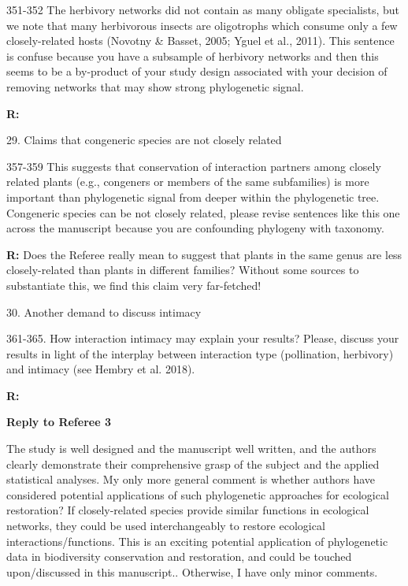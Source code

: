 \documentclass[12pt]{letter}
\newenvironment{refquote}{\bigskip \begin{it}}{\end{it}\smallskip}
\begin{document}
		\begin{refquote}
			351-352 The herbivory networks did not contain as many obligate specialists, but we note that many herbivorous insects are oligotrophs which consume only a few closely-related hosts (Novotny & Basset, 2005; Yguel et al., 2011). This sentence is confuse because you have a subsample of herbivory networks and then this seems to be a by-product of your study design associated with your decision of removing networks that may show strong phylogenetic signal.
		\end{refquote}

		\textbf{R:} 


	29. Claims that congeneric species are not closely related

		\begin{refquote}
			357-359 This suggests that conservation of interaction partners among closely related plants (e.g., congeners or members of the same subfamilies) is more important than phylogenetic signal from deeper within the phylogenetic tree. Congeneric species can be not closely related, please revise sentences like this one across the manuscript because you are confounding phylogeny with taxonomy.
		\end{refquote}


		\textbf{R:} Does the Referee really mean to suggest that plants in the same genus are less closely-related than plants in different families? Without some sources to substantiate this, we find this claim very far-fetched!


	30. Another demand to discuss intimacy

		\begin{refquote}
			361-365. How interaction intimacy may explain your results? Please, discuss your results in light of the interplay between interaction type (pollination, herbivory) and intimacy (see Hembry et al. 2018).
		\end{refquote}


		\textbf{R:}


\clearpage

{\Large \bf Reply to Referee 3}

	\begin{refquote}
		The study is well designed and the manuscript well written, and the authors clearly demonstrate their comprehensive grasp of the subject and the applied statistical analyses.
		My only more general comment is whether authors have considered potential applications of such phylogenetic approaches for ecological restoration? If closely-related species provide similar functions in ecological networks, they could be used interchangeably to restore ecological interactions/functions. This is an exciting potential application of phylogenetic data in biodiversity conservation and restoration, and could be touched upon/discussed in this manuscript.. 
		Otherwise, I have only minor comments.
	\end{refquote}
\end{document}
